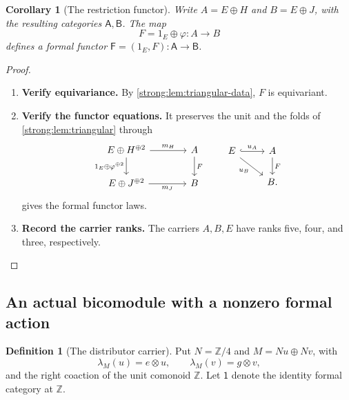 \documentclass[11pt,reqno]{amsart}
\theoremstyle{plain}
\newtheorem{corollary}[theorem]{Corollary}
\theoremstyle{definition}
\newtheorem{definition}[theorem]{Definition}
\theoremstyle{remark}
\numberwithin{equation}{section}
\newcommand{\Z}{\mathbb Z}
\newcommand{\Icat}{\mathsf 1}
\begin{document}
\begin{corollary}[The restriction functor]\label{strong:cor:triangular-functor}
Write $A=E\oplus H$ and $B=E\oplus J$, with the resulting categories
$\mathsf A,\mathsf B$. The map
\[
F=1_E\oplus\varphi:A\longrightarrow B
\]
defines a formal functor $\mathsf F=(1_E,F):\mathsf A\to\mathsf B$.
\end{corollary}
\begin{proof}\leavevmode
\begin{enumerate}
\item \textbf{Verify equivariance.} By \cref{strong:lem:triangular-data}, $F$ is equivariant.

\item \textbf{Verify the functor equations.} It preserves
the unit and the folds of \cref{strong:lem:triangular} through
\[
\begin{tikzcd}[column sep=3.8em]
E\oplus H^{\oplus2} \arrow[r,"m_H"]
  \arrow[d,"1_E\oplus\varphi^{\oplus2}"'] &
A \arrow[d,"F"]\\
E\oplus J^{\oplus2} \arrow[r,"m_J"'] & B
\end{tikzcd}
\qquad
\begin{tikzcd}
E \arrow[r,hook,"u_A"] \arrow[dr,"u_B"'] &
A \arrow[d,"F"]\\
& B.
\end{tikzcd}
\]
 gives the formal functor laws.

\item \textbf{Record the carrier ranks.} The carriers $A,B,E$ have ranks five, four, and three, respectively.\qedhere
\end{enumerate}
\end{proof}

\subsection{An actual bicomodule with a nonzero formal action}

\begin{definition}[The distributor carrier]\label{strong:def:M}
Put $N=\Z/4$ and $M=Nu\oplus Nv$, with
\[
\lambda_M(u)=e\otimes u,\qquad
\lambda_M(v)=g\otimes v,
\]
and the right coaction of the unit comonoid $\Z$.
Let $\Icat$ denote the identity formal category at $\Z$.
\end{definition}
\end{document}
